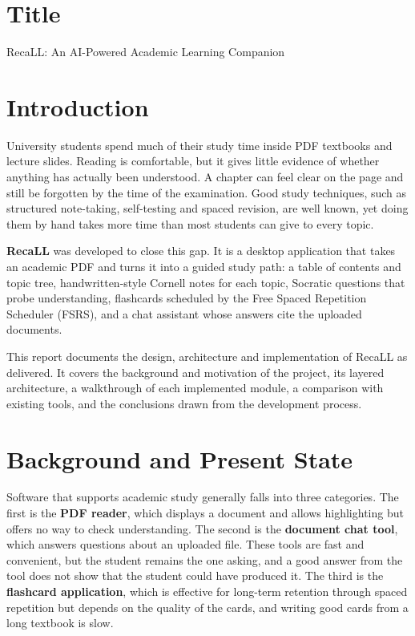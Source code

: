 \documentclass[12pt,a4paper]{article}
\begin{document}
\section{Title}
RecaLL: An AI-Powered Academic Learning Companion

\section{Introduction}
University students spend much of their study time inside PDF textbooks and lecture
slides. Reading is comfortable, but it gives little evidence of whether anything has
actually been understood. A chapter can feel clear on the page and still be forgotten
by the time of the examination. Good study techniques, such as structured note-taking,
self-testing and spaced revision, are well known, yet doing them by hand takes more
time than most students can give to every topic.

\textbf{RecaLL} was developed to close this gap. It is a desktop application that takes
an academic PDF and turns it into a guided study path: a table of contents and topic
tree, handwritten-style Cornell notes for each topic, Socratic questions that probe
understanding, flashcards scheduled by the Free Spaced Repetition Scheduler (FSRS),
and a chat assistant whose answers cite the uploaded documents.

This report documents the design, architecture and implementation of RecaLL as
delivered. It covers the background and motivation of the project, its layered
architecture, a walkthrough of each implemented module, a comparison with existing
tools, and the conclusions drawn from the development process.

\section{Background and Present State}
Software that supports academic study generally falls into three categories. The first
is the \textbf{PDF reader}, which displays a document and allows highlighting but offers
no way to check understanding. The second is the \textbf{document chat tool}, which
answers questions about an uploaded file. These tools are fast and convenient, but the
student remains the one asking, and a good answer from the tool does not show that the
student could have produced it. The third is the \textbf{flashcard application}, which
is effective for long-term retention through spaced repetition but depends on the
quality of the cards, and writing good cards from a long textbook is slow.
\end{document}
